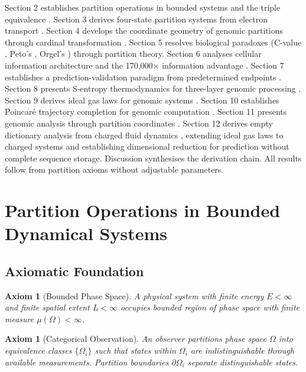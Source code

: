 \documentclass[11pt,a4paper]{article}
\newtheorem{axiom}[theorem]{Axiom}
\theoremstyle{remark}
\begin{document}
Section 2 establishes partition operations in bounded systems and the triple equivalence \citep{poincare1890probleme, birkhoff1931proof}. Section 3 derives four-state partition systems from electron transport \citep{mitchell1961coupling, nicholls2013bioenergetics}. Section 4 develops the coordinate geometry of genomic partitions through cardinal transformation \citep{nandy2006graphical, yau2003dna}. Section 5 resolves biological paradoxes (C-value \citep{gregory2001coincidence}, Peto's \citep{peto1977naturally}, Orgel's \citep{orgel1968evolution}) through partition theory. Section 6 analyses cellular information architecture and the 170,000$\times$ information advantage \citep{shannon1948mathematical, elowitz2002stochastic}. Section 7 establishes a prediction-validation paradigm from predetermined endpoints \citep{landauer1961irreversibility}. Section 8 presents S-entropy thermodynamics for three-layer genomic processing \citep{callen1985thermodynamics}. Section 9 derives ideal gas laws for genomic systems \citep{reif1965fundamentals}. Section 10 establishes Poincaré trajectory completion for genomic computation \citep{poincare1890probleme}. Section 11 presents genomic analysis through partition coordinates \citep{altschul1990basic, gusfield1997algorithms}. Section 12 derives empty dictionary analysis from charged fluid dynamics \citep{chen2016introduction, debye1923theory}, extending ideal gas laws to charged systems and establishing dimensional reduction for prediction without complete sequence storage. Discussion synthesises the derivation chain. All results follow from partition axioms without adjustable parameters.

\section{Partition Operations in Bounded Dynamical Systems}

\subsection{Axiomatic Foundation}

\begin{axiom}[Bounded Phase Space]
\label{ax:bounded_phase}
A physical system with finite energy $E < \infty$ and finite spatial extent $L < \infty$ occupies bounded region of phase space with finite measure $\mu(\Omega) < \infty$.
\end{axiom}

\begin{axiom}[Categorical Observation]
\label{ax:categorical_obs}
An observer partitions phase space $\Omega$ into equivalence classes $\{\Omega_i\}$ such that states within $\Omega_i$ are indistinguishable through available measurements. Partition boundaries $\partial\Omega_i$ separate distinguishable states.
\end{axiom}
\end{document}
